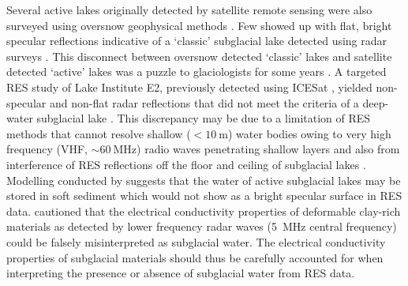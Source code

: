 Several active lakes originally detected by satellite remote sensing were also surveyed using oversnow geophysical methods \citep[e.g.][]{ChristiansonSubglacialLakeWhillans2012,WrightSubglacialhydrologicalconnectivity2014}.
Few showed up with flat, bright specular reflections indicative of a `classic' subglacial lake detected using radar surveys \citep[][]{CarterRadarbasedsubglaciallake2007}.
This disconnect between oversnow detected `classic' lakes and satellite detected `active' lakes was a puzzle to glaciologists for some years \citep{SiegertRecentadvancesunderstanding2016}.
A targeted \gls{RES} study of Lake Institute E2, previously detected using ICESat \citep{Smithinventoryactivesubglacial2009}, yielded non-specular and non-flat radar reflections that did not meet the criteria of a deep-water subglacial lake \citep{SiegertBoundaryconditionsactive2014}.
This discrepancy may be due to a limitation of \gls{RES} methods that cannot resolve shallow ($< \SI{10}{\metre}$) water bodies owing to very high frequency (VHF, $\sim\SI{60}{\mega\hertz}$) radio waves penetrating shallow layers and also from interference of \gls{RES} reflections off the floor and ceiling of subglacial lakes \citep{GormanPenetrationAntarcticsubglacial1999}.
Modelling conducted by \citet{CarterAntarcticsubglaciallakes2017} suggests that the water of active subglacial lakes may be stored in soft sediment which would not show as a bright specular surface in \gls{RES} data.
\citet{Tulaczykroleelectricalconductivity2020} cautioned that the electrical conductivity properties of deformable clay-rich materials as detected by lower frequency radar waves (\SI{5}{\mega\hertz} central frequency) could be falsely misinterpreted as subglacial water.
The electrical conductivity properties of subglacial materials should thus be carefully accounted for when interpreting the presence or absence of subglacial water from \gls{RES} data.


